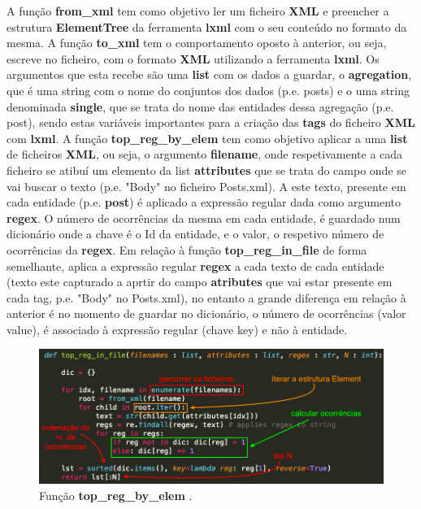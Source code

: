 \documentclass[11pt,a4paper]{report}%
\begin{document}
A função \textbf{from\_xml} tem como objetivo ler um ficheiro \textbf{XML} e preencher a estrutura \textbf{ElementTree} da ferramenta \textbf{lxml} com o seu conteúdo no formato da mesma.
\newline \newline
A função \textbf{to\_xml} tem o comportamento oposto à anterior, ou seja, escreve no ficheiro, com o formato \textbf{XML} utilizando a ferramenta \textbf{lxml}. Os argumentos que esta recebe são uma \textbf{list} com os dados a guardar, o \textbf{agregation}, que é uma string com o nome do conjuntos dos dados (p.e. posts) e o uma string denominada \textbf{single}, que se trata do nome das entidades dessa agregação (p.e. post), sendo estas variáveis importantes para a criação das \textbf{tags} do ficheiro \textbf{XML} com \textbf{lxml}.\newline 
\newline A função \textbf{top\_reg\_by\_elem} tem como objetivo aplicar a uma \textbf{list} de ficheiros \textbf{XML}, ou seja, o argumento \textbf{filename}, onde respetivamente a cada ficheiro se atibuí um elemento da list \textbf{attributes} que se trata do campo onde se vai buscar o texto (p.e. "Body" no ficheiro Posts.xml). A este texto, presente em cada entidade (p.e. \textbf{post}) é aplicado a expressão regular dada como argumento \textbf{regex}. O número de ocorrências da mesma em cada entidade, é guardado num dicionário onde a chave é o Id da entidade, e o valor, o respetivo número de ocorrências da \textbf{regex}.\newline
\newline Em relação à função \textbf{top\_reg\_in\_file} de forma semelhante, aplica a expressão regular \textbf{regex} a cada texto de cada entidade (texto este capturado a aprtir do campo \textbf{atributes} que vai estar presente em cada tag, p.e. "Body" no Posts.xml), no entanto a grande diferença em relação à anterior é no momento de guardar no dicionário, o número de ocorrências (valor \/ value), é associado à expressão regular (chave \/ key) e não à entidade.

\begin{figure}[]
	\centering
	\includegraphics[scale=0.6]{f1.png}
	\caption{Função \textbf{top\_reg\_by\_elem} .}
	\label{img:pag}
\end{figure}
\end{document}
